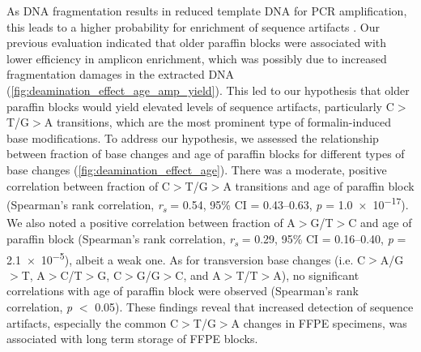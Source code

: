 As DNA fragmentation results in reduced template DNA for PCR amplification, this leads to a higher probability for enrichment of sequence artifacts \cite{Carrick2015, Wong2014}. Our previous evaluation indicated that older paraffin blocks were associated with lower efficiency in amplicon enrichment, which was possibly due to increased fragmentation damages in the extracted DNA (\autoref{fig:deamination_effect_age_amp_yield}). This led to our hypothesis that older paraffin blocks would yield elevated levels of sequence artifacts, particularly C$>$T/G$>$A transitions, which are the most prominent type of formalin-induced base modifications. To address our hypothesis, we assessed the relationship between fraction of base changes and age of paraffin blocks for different types of base changes (\autoref{fig:deamination_effect_age}). There was a moderate, positive correlation between fraction of C$>$T/G$>$A transitions and age of paraffin block (Spearman's rank correlation, \textit{r\textsubscript{s}} = 0.54, 95\% CI = 0.43--0.63, \textit{p} = \num{1.0e-17}). We also noted a positive correlation between fraction of A$>$G/T$>$C and age of paraffin block (Spearman's rank correlation, \textit{r\textsubscript{s}} = 0.29, 95\% CI = 0.16--0.40, \textit{p} = \num{2.1e-5}), albeit a weak one. As for transversion base changes (i.e. C$>$A/G$>$T, A$>$C/T$>$G, C$>$G/G$>$C, and A$>$T/T$>$A), no significant correlations with age of paraffin block were observed (Spearman's rank correlation, \textit{p} $<$ \num{0.05}). These findings reveal that increased detection of sequence artifacts, especially the common C$>$T/G$>$A changes in FFPE specimens, was associated with long term storage of FFPE blocks.

